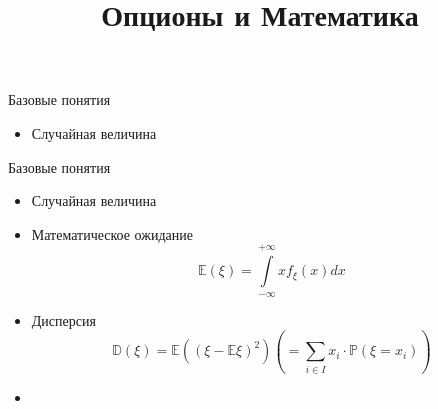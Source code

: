 \documentclass{beamer}
\title[Опционы и Математика]{Опционы и Математика} %
\institute[Sber] %
    {
        \\

        \centering\Large{Ваня Воробьев}\\
        \vspace{0.5cm}
        \begin{center}
            \small
            \href{https://t.me/v0r0bi0v}{t.me/v0r0bi0v} | \href{tel:+79779996957}{+79779996957} | \href{mailto:ievorobev@edu.hse.ru}{IEVorobyev@sberbank.ru}
        \end{center}
    }
\newcommand{\E}{\ensuremath{\mathbb{E}}}
\newcommand{\D}{\ensuremath{\mathbb{D}}}
\renewcommand{\P}{\ensuremath{\mathbb{P}}}
\begin{document}
        \begin{frame}
            \titlepage
        \end{frame}

        \begin{frame}{Базовые понятия}
            \begin{itemize}
                \item Случайная величина
            \end{itemize}
        \end{frame}

        \begin{frame}{Базовые понятия}
            \begin{itemize}
                \item Случайная величина
                \item Математическое ожидание
                \[
                    \E (\xi) = \int\limits_{-\infty}^{+\infty} xf_{\xi}(x) dx
                \]
                \item Дисперсия
                \[
                    \D (\xi) = \E\left((\xi - \E \xi)^2\right) \left( = \sum\limits_{i\in I} x_i \cdot \P(\xi = x_i) \right)
                \]
                \item
            \end{itemize}
        \end{frame}

        \begin{Что такое опцион}

        \end{Что такое опцион}


    
\end{document}
